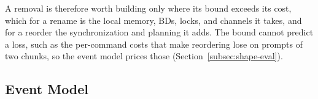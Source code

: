 A removal is therefore worth building only where its bound exceeds its cost, which for a rename is the local memory, BDs, locks, and channels it takes, and for a reorder the synchronization and planning it adds.
The bound cannot predict a loss, such as the per-command costs that make reordering lose on prompts of two chunks, so the event model prices those (Section~\ref{subsec:shape-eval}).

\subsection{Event Model}
\label{subsec:pricing}

